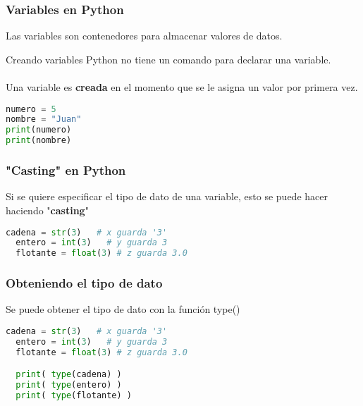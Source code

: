 \begin{frame}[fragile]
  \frametitle{Variables en Python}

  Las variables son contenedores para almacenar valores de datos.

  \begin{block}{Creando variables}
    Python no tiene un comando para declarar una variable. \\~\\
    Una variable es \textbf{creada} en el momento que se le asigna un
    valor por primera vez.
  \end{block}

  \begin{lstlisting}[language=Python]
numero = 5
nombre = "Juan"
print(numero)
print(nombre)
  \end{lstlisting}
\end{frame}

\begin{frame}[fragile]
  \frametitle{"Casting" en Python}

  Si se quiere especificar el tipo de dato de una variable, esto se puede hacer
  haciendo "\textbf{casting}"

  \vspace{\baselineskip}
  \begin{lstlisting}[language=Python]
  cadena = str(3)   # x guarda '3'
  entero = int(3)   # y guarda 3
  flotante = float(3) # z guarda 3.0
  \end{lstlisting}
\end{frame}

\begin{frame}[fragile]
  \frametitle{Obteniendo el tipo de dato}

  Se puede obtener el tipo de dato con la función
  \textcolor{codeKeyword}{type}()

  \vspace{\baselineskip}
  \begin{lstlisting}[language=Python]
  cadena = str(3)   # x guarda '3'
  entero = int(3)   # y guarda 3
  flotante = float(3) # z guarda 3.0

  print( type(cadena) )
  print( type(entero) )
  print( type(flotante) )
  \end{lstlisting}
\end{frame}

